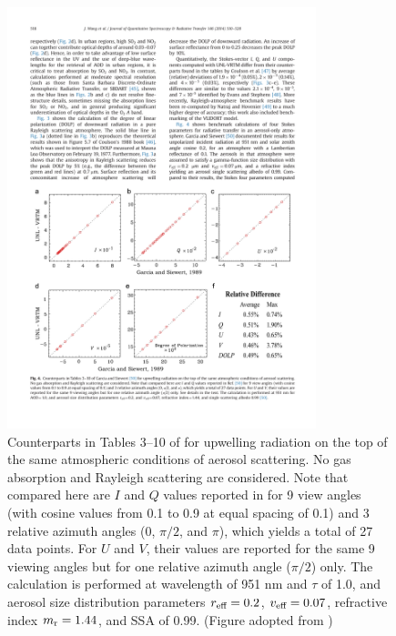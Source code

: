 \begin{figure}[t]
  \centering
  \includegraphics[width={0.8\textwidth}]{figures/unlvrtm3.pdf}
  \caption{Counterparts in Tables 3--10 of \citet{Garcia89} for
upwelling radiation on the top of the same atmospheric conditions of
aerosol scattering. No gas absorption and Rayleigh scattering are
considered. Note that compared here are $I$ and $Q$ values reported 
in \citet{Garcia89} for 9 view angles (with cosine values from 0.1 
to 0.9 at equal spacing of 0.1) and 3 relative azimuth angles 
(0, $\pi/2$, and $\pi$), which yields a total of 27 data points. 
For $U$ and $V$, their values are reported for the same 9 viewing angles 
but for one relative azimuth angle ($\pi/2$) only. 
The calculation is performed at wavelength of 951 nm and $\tau$ of 1.0, 
and aerosol size distribution parameters $r_\text{eff}=0.2$, 
$v_\text{eff}=0.07$, refractive index $m_\text{r}=1.44$, and SSA of 0.99.
(Figure adopted from \citet{Wang14}) }
  \label{fig:unlvrtm3}
\end{figure}

